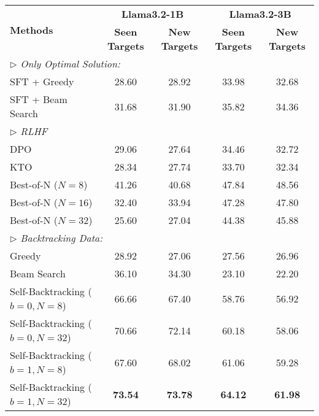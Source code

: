\begin{tabular}{lcccc}
\toprule
\multirow{2}{*}{\textbf{Methods}} & \multicolumn{2}{c}{\textbf{Llama3.2-1B}}& \multicolumn{2}{c}{\textbf{Llama3.2-3B}}\\
\cmidrule{2-5}
& {\textbf{Seen Targets}} & {\textbf{New Targets}} & {\textbf{Seen Targets}} & {\textbf{New Targets}} \\
\midrule
\multicolumn{5}{l}{\(\triangleright\) \textit{Only Optimal Solution:}} \\
\midrule
  SFT + Greedy & 28.60 & 28.92 & 33.98 & 32.68 \\
  SFT + Beam Search & 31.68 & 31.90 & 35.82 & 34.36 \\
\midrule
  \multicolumn{5}{l}{\(\triangleright\) \textit{RLHF}} \\
\midrule
  DPO \cite{dpo}& 29.06 & 27.64
  & 34.46 & 32.72 \\
KTO \cite{kto} &  28.34 & 27.74 & 33.70 & 32.34\\
 Best-of-N ($N=8$)& 41.26 &40.68  & 47.84 &48.56  \\
 Best-of-N ($N=16$)&32.40 & 33.94&47.28  & 47.80 \\
  Best-of-N ($N=32$)&25.60 &27.04 &44.38  &45.88  \\
\midrule
  \multicolumn{5}{l}{\(\triangleright\) \textit{Backtracking Data:}} \\
\midrule
Greedy & 28.92 & 27.06 &27.56  & 26.96 \\
Beam Search & 36.10 & 34.30 & 23.10 & 22.20 \\
Self-Backtracking ($b=0,N=8$) & 66.66 &       67.40 &58.76 & 56.92 \\
Self-Backtracking ($b=0,N=32$) & 70.66 &    72.14 & 60.18& 58.06  \\
Self-Backtracking ($b=1,N=8$) & 67.60 &       68.02 &61.06 & 59.28 \\
Self-Backtracking ($b=1,N=32$) & \textbf{73.54} &  \textbf{73.78} & \textbf{64.12} & \textbf{61.98} \\
\bottomrule
\end{tabular}

